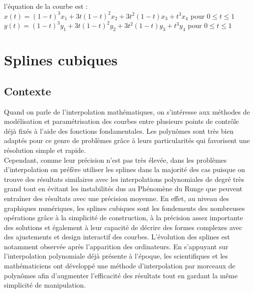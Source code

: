 \documentclass{article}
\begin{document}
l'\'{e}quation de la courbe est :
\\[5pt]
$x(t) = (1-t)^3 x_1 + 3t(1-t)^2 x_2 + 3t^2 (1-t)x_3 + t^3 x_4$ pour $0 \leq t \leq 1$
\\[5pt]
$y(t) = (1-t)^3 y_1 + 3t(1-t)^2 y_2 + 3t^2 (1-t)y_3 + t^3 y_4$ pour $0 \leq t \leq 1$

\newpage
\section{Splines cubiques} 
\subsection{Contexte} 

Quand on parle de l'interpolation math\'{e}matiques, on s'int\'{e}resse aux m\'{e}thodes de mod\'{e}lisation et param\'{e}trisation des courbes entre plusieurs points de contr\^{o}le d\'{e}j\`{a} fix\'{e}s \`{a} l'aide des fonctions fondamentales. Les polyn\^{o}mes sont tr\`{e}s bien adapt\'{e}s pour ce genre de probl\`{e}mes gr\^{a}ce \`{a} leurs particularit\'{e}s qui favorisent une r\'{e}solution simple et rapide. 
\\
\indent
Cependant, comme leur pr\'{e}cision n'est pas tr\`{e}s \'{e}lev\'{e}e, dans les probl\`{e}mes d'interpolation on pr\'{e}f\`{e}re utiliser les splines dans la majorit\'{e} des cas puisque on trouve des r\'{e}sultats similaires avec les interpolations polynomiales de degr\'{e} tr\`{e}s grand tout en \'{e}vitant les instabilit\'{e}s dus au Ph\'{e}nom\`{e}ne du Runge que peuvent entra\^{i}ner des r\'{e}sultats avec une pr\'{e}cision moyenne. En effet, au niveau des graphiques num\'{e}riques, les splines cubiques sont les fondements des nombreuses op\'{e}rations gr\^{a}ce \`{a} la simplicit\'{e} de construction, \`{a} la pr\'{e}cision assez importante des solutions et \'{e}galement \`{a} leur capacit\'{e} de d\'{e}crire des formes complexes avec des ajustements et design interactif des courbes. 
L'\'{e}volution des splines est notamment observ\'{e}e apr\`{e}s l'apparition des ordinateurs. En s'appuyant sur l'interpolation polynomiale d\'{e}j\`{a} pr\'{e}sente \`{a} l'\'{e}poque, les scientifiques et les math\'{e}maticiens ont d\'{e}velopp\'{e} une m\'{e}thode d'interpolation par morceaux de polyn\^{o}mes afin d'augmenter l'efficacit\'{e} des r\'{e}sultats tout en gardant la m\^{e}me simplicit\'{e} de manipulation. 
\\
\indent
\end{document}
